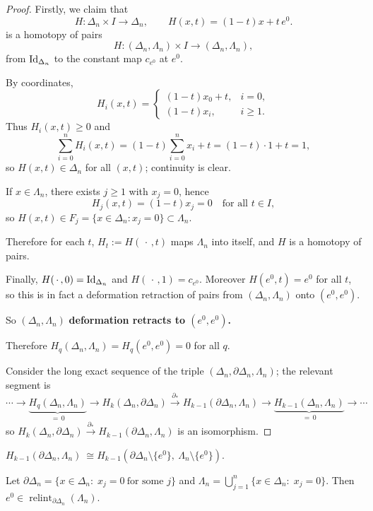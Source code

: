 \begin{proof}
Firstly, we claim that 
\[
H:\Delta_n\times I\longrightarrow \Delta_n,\qquad
H(x,t)=(1-t)x+t\,e^0.
\]
is a homotopy of pairs
\[
H:(\Delta_n,\Lambda_n)\times I\longrightarrow(\Delta_n,\Lambda_n),
\]
from $\operatorname{Id}_{\Delta_n}$ to the constant map $c_{e^0}$ at $e^0$.

By coordinates,
\[
H_i(x,t)=
\begin{cases}
(1-t)x_0+t, & i=0,\\[2pt]
(1-t)x_i,   & i\ge 1.
\end{cases}
\]
Thus $H_i(x,t)\ge0$ and
\[
\sum_{i=0}^n H_i(x,t)=(1-t)\sum_{i=0}^n x_i+t=(1-t)\cdot1+t=1,
\]
so $H(x,t)\in\Delta_n$ for all $(x,t)$; continuity is clear.

If $x\in\Lambda_n$, there exists $j\ge1$ with $x_j=0$, hence
\[
H_j(x,t)=(1-t)x_j=0\quad\text{for all }t\in I,
\]
so $H(x,t)\in F_j=\{x\in\Delta_n:x_j=0\}\subset\Lambda_n$. 

Therefore for each $t$,
$H_t:=H(\,\cdot\,,t)$ maps $\Lambda_n$ into itself, and $H$ is a homotopy of pairs.

Finally, $H(\,\cdot\,,0)=\operatorname{Id}_{\Delta_n}$ and $H(\,\cdot\,,1)=c_{e^0}$.
Moreover $H(e^0,t)=e^0$ for all $t$, so this is in fact a deformation retraction of
pairs from $(\Delta_n,\Lambda_n)$ onto $(e^0,e^0)$.

So \textbf{$(\Delta_n,\Lambda_n)$ }\textbf{deformation retracts to $(e^0,e^0)$.}

Therefore $H_q(\Delta_n,\Lambda_n)=H_q(e^0,e^0)=0$ for all $q$.

Consider the long exact sequence of the triple $(\Delta_n,\partial \Delta_n,\Lambda_n)$; the relevant segment is
\[
\cdots \to \underbrace{H_q(\Delta_n,\Lambda_n)}_{=\, 0} \to H_k(\Delta_n,\partial \Delta_n)
\xrightarrow{\ \partial_*\ } H_{k-1}(\partial \Delta_n,\Lambda_n)
\to \underbrace{H_{k-1}(\Delta_n,\Lambda_n)}_{=\,0} \to \cdots
\]
so $H_k(\Delta_n,\partial \Delta_n)\xrightarrow{\partial_*} H_{k-1}(\partial \Delta_n,\Lambda_n)$ is an isomorphism.
\end{proof}

\begin{proposition}\label{prop 2.4}
    $H_{k-1}(\partial \Delta_n,\Lambda_n)\ \cong
H_{k-1}(\partial \Delta_n\setminus\{e^0\},\ \Lambda_n\setminus\{e^0\})$.
\end{proposition}

\begin{lemma}\label{lem:relint-apex}
Let $\partial\Delta_n=\{x\in\Delta_n:\; x_j=0\ \text{for some }j\}$ and
$\Lambda_n=\bigcup_{j=1}^n\{x\in\Delta_n:\; x_j=0\}$.
Then $e^0\in\operatorname{relint}_{\partial\Delta_n}(\Lambda_n)$.
\end{lemma}

